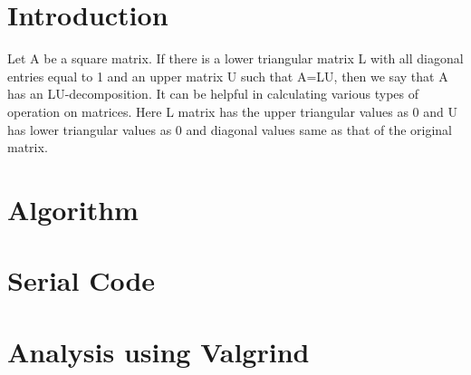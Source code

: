 \documentclass{sem5}
\author{Dilip Puri}
\author{Hemant Kumar}
\author{Govind Meena}
\begin{document}
\section{Introduction}
Let A be a square matrix. If there is a lower triangular matrix L with all diagonal entries equal to 1 and an upper matrix U such that A=LU, then we say that A has an LU-decomposition. It can be helpful in calculating various types of operation on matrices. Here L matrix has the upper triangular values as 0 and U has lower triangular values as 0 and diagonal values same as that of the original matrix. 
\section{Algorithm}


\section{Serial Code}
\section{Analysis using Valgrind}


\end{document}
